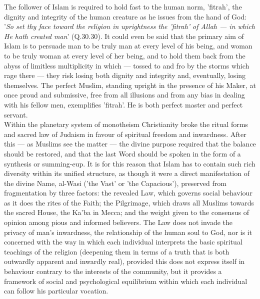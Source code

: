 \documentclass[11pt, b5paper, twoside]{book}
\begin{document}
The follower of Islam is required to hold fast to the human norm, 'fitrah', the dignity and integrity 
of the human creature as he issues from the hand of God: '\emph{So set thy face toward the religion in 
uprightness the 'fitrah' of Allah --- in which He hath created man}' (Q.30.30). It could even be said 
that the primary aim of Islam is to persuade man to be truly man at every level of his being, and 
woman to be truly woman at every level of her being, and to hold them back from the abyss of 
limitless multiplicity in which --- tossed to and fro by the storms which rage there --- they risk losing 
both dignity and integrity and, eventually, losing themselves. The perfect Muslim, standing upright 
in the presence of his Maker, at once proud and submissive, free from all illusions and from any bias 
in dealing with his fellow men, exemplifies 'fitrah'. He is both perfect master and perfect servant. \\

Within the planetary system of monotheism Christianity broke the ritual forms and sacred law of 
Judaism in favour of spiritual freedom and inwardness. After this --- as Muslims see the matter --- the 
divine purpose required that the balance should be restored, and that the last Word should be spoken 
in the form of a synthesis or summing-eup. It is for this reason that Islam has to contain such rich 
diversity within its unified structure, as though it were a direct manifestation of the divine Name, 
al-Wasi ('the Vast' or 'the Capacious'), preserved from fragmentation by three factors: the revealed 
Law, which governs social behaviour as it does the rites of the Faith; the Pilgrimage, which draws 
all Muslims towards the sacred House, the Ka'ba in Mecca; and the weight given to the consensus of 
opinion among pious and informed believers. The Law does not invade the privacy of man's inwardness, 
the relationship of the human soul to God, nor is it concerned with the way in which each individual 
interprets the basic spiritual teachings of the religion (deepening them in terms of a truth that is 
both outwardly apparent and inwardly real), provided this does not express itself in behaviour 
contrary to the interests of the community, but it provides a framework of social and psychological 
equilibrium within which each individual can follow his particular vocation. \\
\end{document}
